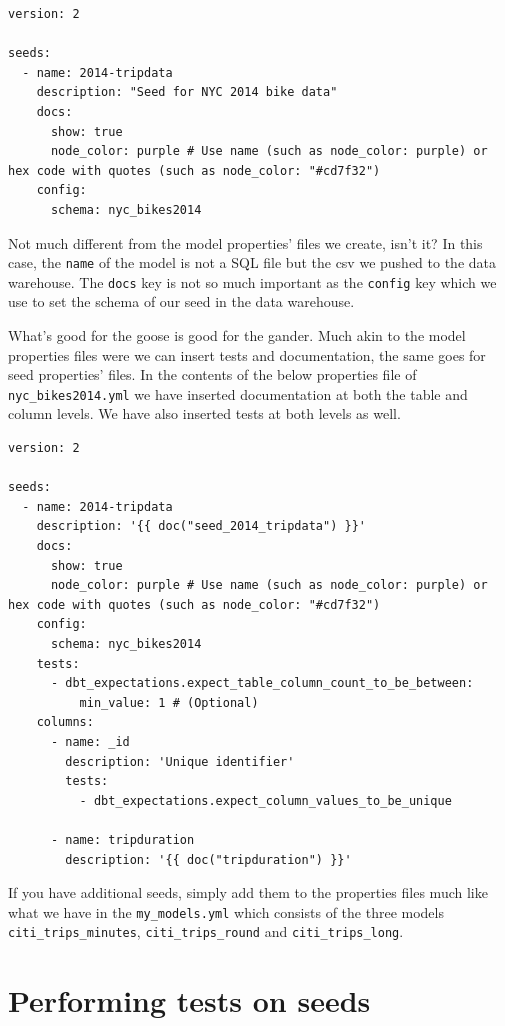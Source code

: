 \documentclass[
]{book}
\begin{document}
\begin{verbatim}
version: 2

seeds:
  - name: 2014-tripdata
    description: "Seed for NYC 2014 bike data"
    docs:
      show: true 
      node_color: purple # Use name (such as node_color: purple) or hex code with quotes (such as node_color: "#cd7f32")
    config:
      schema: nyc_bikes2014
\end{verbatim}

Not much different from the model properties' files we create, isn't it? In this case, the \texttt{name} of the model is not a SQL file but the csv we pushed to the data warehouse. The \texttt{docs} key is not so much important as the \texttt{config} key which we use to set the schema of our seed in the data warehouse.

What's good for the goose is good for the gander. Much akin to the model properties files were we can insert tests and documentation, the same goes for seed properties' files. In the contents of the below properties file of \texttt{nyc\_bikes2014.yml} we have inserted documentation at both the table and column levels. We have also inserted tests at both levels as well.

\begin{verbatim}
version: 2

seeds:
  - name: 2014-tripdata
    description: '{{ doc("seed_2014_tripdata") }}'
    docs:
      show: true 
      node_color: purple # Use name (such as node_color: purple) or hex code with quotes (such as node_color: "#cd7f32")
    config:
      schema: nyc_bikes2014
    tests:
      - dbt_expectations.expect_table_column_count_to_be_between:
          min_value: 1 # (Optional)
    columns:
      - name: _id
        description: 'Unique identifier'
        tests:
          - dbt_expectations.expect_column_values_to_be_unique

      - name: tripduration
        description: '{{ doc("tripduration") }}'
\end{verbatim}

If you have additional seeds, simply add them to the properties files much like what we have in the \texttt{my\_models.yml} which consists of the three models \texttt{citi\_trips\_minutes}, \texttt{citi\_trips\_round} and \texttt{citi\_trips\_long}.

\hypertarget{performing-tests-on-seeds}{%
\section{Performing tests on seeds}\label{performing-tests-on-seeds}}
\end{document}
